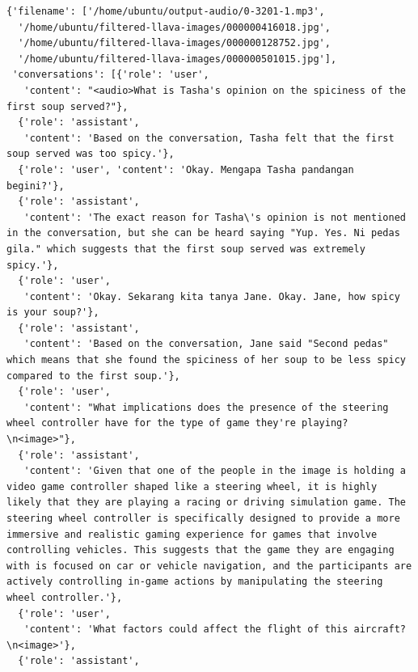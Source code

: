 \documentclass[preprint]{article}
\begin{document}
\begin{lstlisting}[breaklines=true]
  {'filename': ['/home/ubuntu/output-audio/0-3201-1.mp3',
  '/home/ubuntu/filtered-llava-images/000000416018.jpg',
  '/home/ubuntu/filtered-llava-images/000000128752.jpg',
  '/home/ubuntu/filtered-llava-images/000000501015.jpg'],
 'conversations': [{'role': 'user',
   'content': "<audio>What is Tasha's opinion on the spiciness of the first soup served?"},
  {'role': 'assistant',
   'content': 'Based on the conversation, Tasha felt that the first soup served was too spicy.'},
  {'role': 'user', 'content': 'Okay. Mengapa Tasha pandangan begini?'},
  {'role': 'assistant',
   'content': 'The exact reason for Tasha\'s opinion is not mentioned in the conversation, but she can be heard saying "Yup. Yes. Ni pedas gila." which suggests that the first soup served was extremely spicy.'},
  {'role': 'user',
   'content': 'Okay. Sekarang kita tanya Jane. Okay. Jane, how spicy is your soup?'},
  {'role': 'assistant',
   'content': 'Based on the conversation, Jane said "Second pedas" which means that she found the spiciness of her soup to be less spicy compared to the first soup.'},
  {'role': 'user',
   'content': "What implications does the presence of the steering wheel controller have for the type of game they're playing?\n<image>"},
  {'role': 'assistant',
   'content': 'Given that one of the people in the image is holding a video game controller shaped like a steering wheel, it is highly likely that they are playing a racing or driving simulation game. The steering wheel controller is specifically designed to provide a more immersive and realistic gaming experience for games that involve controlling vehicles. This suggests that the game they are engaging with is focused on car or vehicle navigation, and the participants are actively controlling in-game actions by manipulating the steering wheel controller.'},
  {'role': 'user',
   'content': 'What factors could affect the flight of this aircraft?\n<image>'},
  {'role': 'assistant',

\end{lstlisting}
\end{document}
